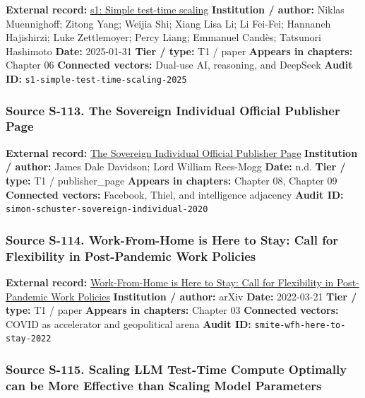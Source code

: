 \documentclass[
  american,
  11pt,
  letterpaper,
]{article}
\begin{document}
\textbf{External record:} \href{https://arxiv.org/abs/2501.19393}{s1:
Simple test-time scaling} \textbf{Institution / author:} Niklas
Muennighoff; Zitong Yang; Weijia Shi; Xiang Lisa Li; Li Fei-Fei;
Hannaneh Hajishirzi; Luke Zettlemoyer; Percy Liang; Emmanuel Candès;
Tatsunori Hashimoto \textbf{Date:} 2025-01-31 \textbf{Tier / type:} T1 /
paper \textbf{Appears in chapters:} Chapter 06 \textbf{Connected
vectors:} Dual-use AI, reasoning, and DeepSeek \textbf{Audit ID:}
\texttt{s1-simple-test-time-scaling-2025}

\subsubsection{Source S-113. The Sovereign Individual \textbar{}
Official Publisher
Page}\label{source-s-113-the-sovereign-individual-official-publisher-page}

\textbf{External record:}
\href{https://www.simonandschuster.com/books/The-Sovereign-Individual/James-Dale-Davidson/9780684832722}{The
Sovereign Individual \textbar{} Official Publisher Page}
\textbf{Institution / author:} James Dale Davidson; Lord William
Rees-Mogg \textbf{Date:} n.d. \textbf{Tier / type:} T1 / publisher\_page
\textbf{Appears in chapters:} Chapter 08, Chapter 09 \textbf{Connected
vectors:} Facebook, Thiel, and intelligence adjacency \textbf{Audit ID:}
\texttt{simon-schuster-sovereign-individual-2020}

\subsubsection{Source S-114. Work-From-Home is Here to Stay: Call for
Flexibility in Post-Pandemic Work
Policies}\label{source-s-114-work-from-home-is-here-to-stay-call-for-flexibility-in-post-pandemic-work-policies}

\textbf{External record:}
\href{https://arxiv.org/abs/2203.11136}{Work-From-Home is Here to Stay:
Call for Flexibility in Post-Pandemic Work Policies} \textbf{Institution
/ author:} arXiv \textbf{Date:} 2022-03-21 \textbf{Tier / type:} T1 /
paper \textbf{Appears in chapters:} Chapter 03 \textbf{Connected
vectors:} COVID as accelerator and geopolitical arena \textbf{Audit ID:}
\texttt{smite-wfh-here-to-stay-2022}

\subsubsection{Source S-115. Scaling LLM Test-Time Compute Optimally can
be More Effective than Scaling Model
Parameters}\label{source-s-115-scaling-llm-test-time-compute-optimally-can-be-more-effective-than-scaling-model-parameters}
\end{document}
